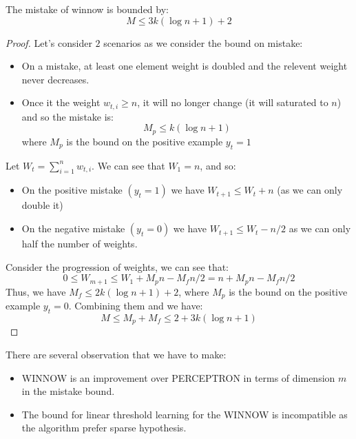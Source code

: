 \begin{theorem}
    The mistake of winnow is bounded by:
    \begin{equation*}
        M \le 3k(\log n + 1) + 2
    \end{equation*}
\end{theorem}
\begin{proof}
    Let's consider $2$ scenarios as we consider the bound on mistake:
    \begin{itemize}
        \item On a mistake, at least one element weight is doubled and the relevent weight never decreases. 
        \item Once it the weight $w_{t, i}\ge n$, it will no longer change (it will saturated to $n$) and so the mistake is:
        \begin{equation*}
            M_p \le k(\log n + 1)
        \end{equation*}
        where $M_p$ is the bound on the positive example $y_t= 1$
    \end{itemize}
    Let $W_t = \sum^n_{i=1}w_{t, i}$. We can see that $W_1 = n$, and so:
    \begin{itemize}
        \item On the positive mistake $(y_t = 1)$ we have $W_{t+1} \le W_t + n$ (as we can only double it)
        \item On the negative mistake $(y_t = 0)$ we have $W_{t+1} \le W_t - n/2$ as we can only half the number of weights.
    \end{itemize}
    Consider the progression of weights, we can see that: 
    \begin{equation*}
        0 \le W_{m+1} \le W_1 + M_pn - M_fn/2 = n + M_pn - M_fn/2 
    \end{equation*}
    Thus, we have $M_f \le 2k(\log n + 1) + 2$, where $M_p$ is the bound on the positive example $y_t= 0$. Combining them and we have:
    \begin{equation*}
        M \le M_p + M_f \le 2 + 3k(\log n + 1)
    \end{equation*}
\end{proof}

\begin{remark}
    There are several observation that we have to make:
    \begin{itemize}
        \item WINNOW is an improvement over PERCEPTRON in terms of dimension $m$ in the mistake bound. 
        \item The bound for linear threshold learning for the WINNOW is incompatible as the algorithm prefer sparse hypothesis. 
    \end{itemize}
\end{remark}


